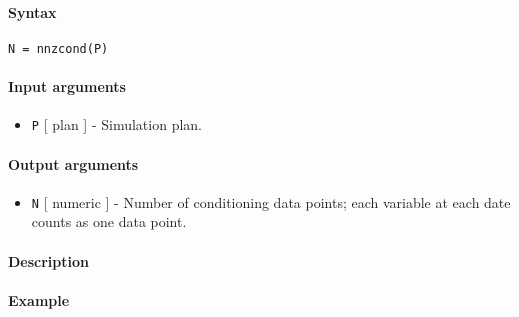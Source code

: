 


	\paragraph{Syntax}

\begin{verbatim}
N = nnzcond(P)
\end{verbatim}

\paragraph{Input arguments}

\begin{itemize}
\itemsep1pt\parskip0pt
\item
  \texttt{P} {[} plan {]} - Simulation plan.
\end{itemize}

\paragraph{Output arguments}

\begin{itemize}
\itemsep1pt\parskip0pt
\item
  \texttt{N} {[} numeric {]} - Number of conditioning data points; each
  variable at each date counts as one data point.
\end{itemize}

\paragraph{Description}

\paragraph{Example}


